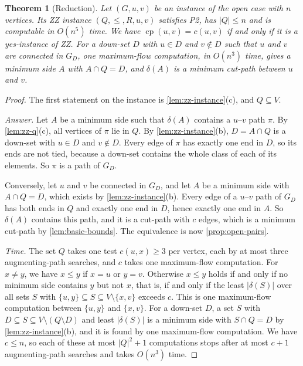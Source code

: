 \documentclass[pdflatex,sn-mathphys-num]{sn-jnl}%
\theoremstyle{thmstyleone}%
\newtheorem{theorem}{Theorem}%
\theoremstyle{thmstyletwo}%
\theoremstyle{thmstylethree}%
\newcommand{\cp}{\operatorname{cp}}%
\begin{document}
\begin{theorem}[Reduction]
\label{thm:zz-reduction}
Let $(G, u, v)$ be an instance of the open case with $n$ vertices.
Its ZZ instance $(Q, \leq, R, u, v)$ satisfies P2, has $|Q| \leq n$ and is computable in $O(n^5)$ time.
We have $\cp(u, v) = c(u, v)$ if and only if it is a yes-instance of ZZ.
For a down-set $D$ with $u \in D$ and $v \notin D$ such that $u$ and $v$ are connected in $G_D$, one maximum-flow computation, in $O(n^3)$ time, gives a minimum side $A$ with $A \cap Q = D$, and $\delta(A)$ is a minimum cut-path between $u$ and $v$.
\end{theorem}

\begin{proof}
The first statement on the instance is \cref{lem:zz-instance}(c), and $Q \subseteq V$.

\emph{Answer.}
Let $A$ be a minimum side such that $\delta(A)$ contains a $u$--$v$ path $\pi$.
By \cref{lem:zz-q}(c), all vertices of $\pi$ lie in $Q$.
By \cref{lem:zz-instance}(b), $D = A \cap Q$ is a down-set with $u \in D$ and $v \notin D$.
Every edge of $\pi$ has exactly one end in $D$, so its ends are not tied, because a down-set contains the whole class of each of its elements.
So $\pi$ is a path of $G_D$.

Conversely, let $u$ and $v$ be connected in $G_D$, and let $A$ be a minimum side with $A \cap Q = D$, which exists by \cref{lem:zz-instance}(b).
Every edge of a $u$--$v$ path of $G_D$ has both ends in $Q$ and exactly one end in $D$, hence exactly one end in $A$.
So $\delta(A)$ contains this path, and it is a cut-path with $c$ edges, which is a minimum cut-path by \cref{lem:basic-bounds}.
The equivalence is now \cref{prop:open-pairs}.

\emph{Time.}
The set $Q$ takes one test $c(u, x) \geq 3$ per vertex, each by at most three augmenting-path searches, and $c$ takes one maximum-flow computation.
For $x \neq y$, we have $x \leq y$ if $x = u$ or $y = v$.
Otherwise $x \leq y$ holds if and only if no minimum side contains $y$ but not $x$, that is, if and only if the least $|\delta(S)|$ over all sets $S$ with $\{u, y\} \subseteq S \subseteq V \setminus \{x, v\}$ exceeds $c$.
This is one maximum-flow computation between $\{u, y\}$ and $\{x, v\}$.
For a down-set $D$, a set $S$ with $D \subseteq S \subseteq V \setminus (Q \setminus D)$ and least $|\delta(S)|$ is a minimum side with $S \cap Q = D$ by \cref{lem:zz-instance}(b), and it is found by one maximum-flow computation.
We have $c \leq n$, so each of these at most $|Q|^2 + 1$ computations stops after at most $c + 1$ augmenting-path searches and takes $O(n^3)$ time.
\end{proof}
\end{document}
